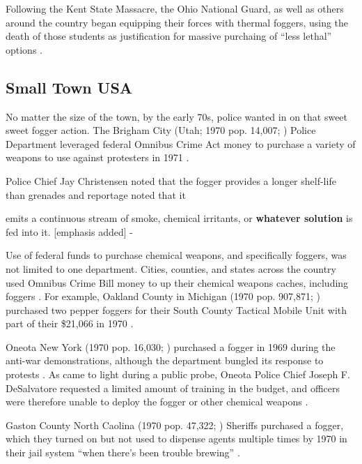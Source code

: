 \documentclass[
  11pt,
]{krantz}
\renewenvironment{quote}{\begin{VF}}{\end{VF}}
\begin{document}
Following the Kent State Massacre, the Ohio National Guard, as well as others around the country began equipping their forces with thermal foggers, using the death of those students as justification for massive purchaing of ``less lethal'' options \citep{Bandy1970}.

\hypertarget{small-town-usa}{%
\subsection*{Small Town USA}\label{small-town-usa}}


No matter the size of the town, by the early 70s, police wanted in on that sweet sweet fogger action.
The Brigham City (Utah; 1970 pop. 14,007; \citet{USCB1970}) Police Department leveraged federal Omnibus Crime Act money to purchase a variety of weapons to use against protesters in 1971 \citep{BoxElderAgencies1971}.

Police Chief Jay Christensen noted that the fogger provides a longer shelf-life than grenades and reportage noted that it

\begin{quote}
emits a continuous stream of smoke, chemical irritants, or \textbf{whatever solution} is fed into it. {[}emphasis added{]} - \citet{Robinson1972}
\end{quote}

Use of federal funds to purchase chemical weapons, and specifically foggers, was not limited to one department.
Cities, counties, and states across the country used Omnibus Crime Bill money to up their chemical weapons caches, including foggers \citep{Conheim1972}.
For example, Oakland County in Michigan (1970 pop. 907,871; \citet{USCB1970}) purchased two pepper foggers for their South County Tactical Mobile Unit with part of their \$21,066 in 1970 \citep{Conheim1972}.

Oneota New York (1970 pop. 16,030; \citet{USCB1970}) purchased a fogger in 1969 during the anti-war demonstrations, although the department bungled its response to protests \citep{Griffin1973}.
As came to light during a public probe, Oneota Police Chief Joseph F. DeSalvatore requested a limited amount of training in the budget, and officers were therefore unable to deploy the fogger or other chemical weapons \citep{Griffin1973}.

Gaston County North Caolina (1970 pop. 47,322; \citet{USCB1970}) Sheriffs purchased a fogger, which they turned on but not used to dispense agents multiple times by 1970 in their jail system ``when there's been trouble brewing'' \citep{Balloch1970}.
\end{document}
